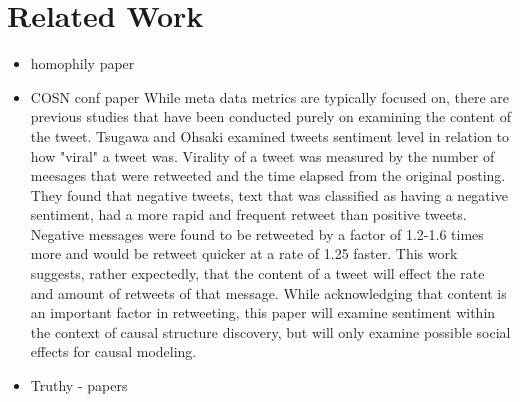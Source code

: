 \section{Related Work}
\label{sec:background}
\begin{itemize}
\item homophily paper
\item COSN conf paper
While meta data metrics are typically focused on, there are previous studies that have been conducted purely on examining the content of the tweet. Tsugawa and Ohsaki examined tweets sentiment level in relation to how "viral" a tweet was. Virality of a tweet was measured by the number of meesages that were retweeted and the time elapsed from the original posting. They found that negative tweets, text that was classified as having a negative sentiment, had a more rapid and frequent retweet than positive tweets. Negative messages were found to be retweeted by a factor of 1.2-1.6 times more and would be retweet quicker at a rate of 1.25 faster. This work suggests, rather expectedly, that the content of a tweet will effect the rate and amount of retweets of that message. While acknowledging that content is an important factor in retweeting, this paper will examine sentiment within the context of causal structure discovery, but will only examine possible social effects for causal modeling. 
\item Truthy - papers
\end{itemize}